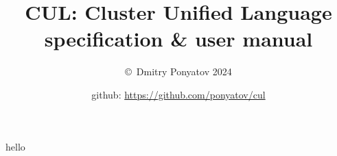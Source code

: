 

\title{{\Huge CUL: Cluster Unified Language}\\specification \& user manual}
\author{\copyright\ Dmitry Ponyatov  2024}
\date{github: \url{https://github.com/ponyatov/cul}}


\maketitle
{}
\tableofcontents\clearpage
hello




